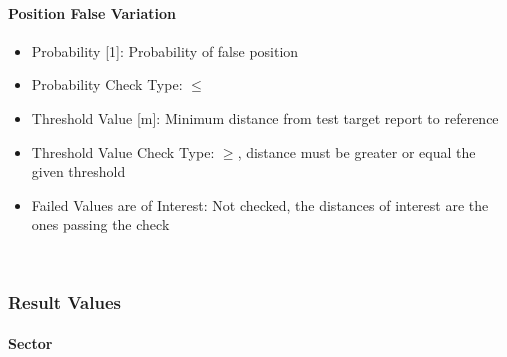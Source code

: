 \paragraph{Position False Variation}

\begin{itemize}  
\item Probability [1]: Probability of false position
\item Probability Check Type: $\leq$
\item Threshold Value [m]: Minimum distance from test target report to reference
\item Threshold Value Check Type: $\geq$, distance must be greater or equal the given threshold
\item Failed Values are of Interest: Not checked, the distances of interest are the ones passing the check
\end{itemize}
\ \\

\subsubsection{Result Values}

\paragraph{Sector}

